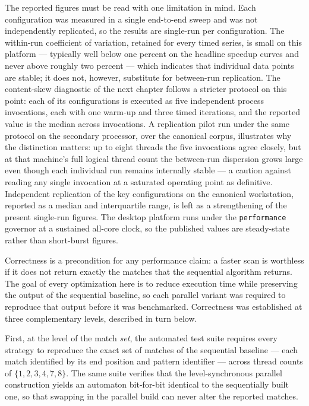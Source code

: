 The reported figures must be read with one limitation in mind. Each configuration
was measured in a single end-to-end sweep and was not independently replicated, so
the results are single-run per configuration. The within-run
coefficient of variation, retained for every timed series, is small on this
platform --- typically well below one percent on the headline speedup curves and
never above roughly two percent --- which indicates that individual data points
are stable; it does not, however, substitute for between-run replication.
The content-skew diagnostic of the next chapter follows a stricter protocol on
this point: each of its configurations is executed as five independent process
invocations, each with one warm-up and three timed iterations, and the reported
value is the median across invocations. A replication pilot run under the same
protocol on the secondary processor, over the canonical corpus, illustrates why
the distinction matters: up to eight threads the five invocations agree closely,
but at that machine's full logical thread count the between-run dispersion grows
large even though each individual run remains internally stable --- a caution
against reading any single invocation at a saturated operating point as
definitive. Independent replication of the key configurations on the canonical
workstation, reported as a median and interquartile range, is left as a
strengthening of the present single-run figures. The desktop platform runs under
the \texttt{performance} governor at a sustained all-core clock, so the
published values are steady-state rather than short-burst figures.

\label{subsec:correctness}

Correctness is a precondition for any performance claim: a faster scan is
worthless if it does not return exactly the matches that the sequential algorithm
returns. The goal of every optimization here is to reduce execution time while
preserving the output of the sequential baseline, so each parallel variant was
required to reproduce that output before it was benchmarked. Correctness was
established at three complementary levels, described in turn below.

First, at the level of the match \emph{set}, the automated test suite requires
every strategy to reproduce the exact set of matches of the sequential baseline
--- each match identified by its end position and pattern identifier --- across
thread counts of $\{1,2,3,4,7,8\}$. The same suite verifies that the
level-synchronous parallel construction yields an automaton bit-for-bit identical
to the sequentially built one, so that swapping in the parallel build can never
alter the reported matches.

